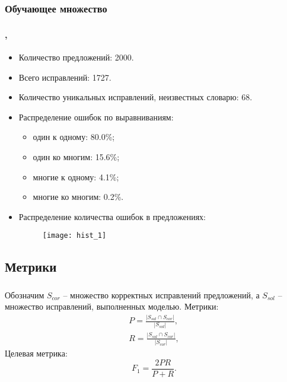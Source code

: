 \documentclass[t, aspectratio=169]{beamer}  %
\begin{document}
\subsubsection{Обучающее множество}
\begin{frame}[allowframebreaks]
	\frametitle{\insertsection} 
	\framesubtitle{\insertsubsection, \insertsubsubsection}
	\begin{itemize}
		\item Количество предложений: 2000.
		\item Всего исправлений: 1727.
		\item Количество уникальных исправлений, неизвестных словарю: 68.
		\item Распределение ошибок по выравниваниям:
			\begin{itemize}
				\item один к одному: 80.0\%;
				\item один ко многим: 15.6\%;
				\item многие к одному: 4.1\%;
				\item многие ко многим: 0.2\%.
			\end{itemize}
		\framebreak
		\item Распределение количества ошибок в предложениях:
		\begin{figure}[!h]
			\begin{center}
				\texttt{[image: hist\_1]}
				\label{ris:hist_1}
			\end{center}
		\end{figure}
	\end{itemize}
\end{frame}

\subsection{Метрики}
\begin{frame}
	\frametitle{\insertsection} 
	\framesubtitle{\insertsubsection}
	Обозначим $S_{cor}$ -- множество корректных исправлений предложений, а $S_{sol}$ -- множество исправлений, выполненных моделью.  Метрики:
	\begin{gather*}
		P = \frac{|S_{sol} \cap S_{cor}|}{|S_{sol}|},
		\\
		R = \frac{|S_{sol} \cap S_{cor}|}{|S_{cor}|},
	\end{gather*}
	Целевая метрика:
	\begin{equation*}
		F_1 = \frac{2 P R}{P + R}.
	\end{equation*}
\end{frame}
\end{document}
